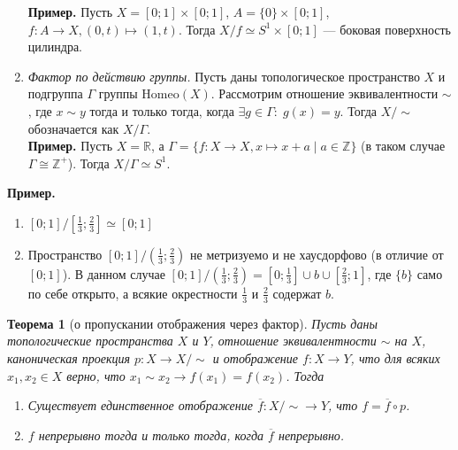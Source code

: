 \documentclass[a4paper,100pt]{article}
\theoremstyle{indented}
\newtheorem{theorem}{Теорема}
\begin{document}
\begin{enumerate}
        \textbf{Пример. }
            Пусть $X = [0; 1] \times [0; 1]$, $A = \{0\} \times [0; 1]$, $f: A \to X, (0, t) \mapsto (1, t)$. Тогда $X/f \simeq S^1 \times [0; 1]$ --- боковая поверхность цилиндра.
        

        \item \emph{Фактор по действию группы.} Пусть даны топологическое пространство $X$ и подгруппа $\Gamma$ группы $\text{Homeo}(X)$. Рассмотрим отношение эквивалентности $\sim$, где $x \sim y$ тогда и только тогда, когда $\exists g \in \Gamma:\; g(x) = y$. Тогда $X/{\sim}$ обозначается как $X/\Gamma$.\\
        
        \textbf{Пример. } 
            Пусть $X = \mathbb{R}$, а $\Gamma = \{f: X \to X, x \mapsto x + a \mid a \in \mathbb{Z}\}$ (в таком случае $\Gamma \cong \mathbb{Z}^+$). Тогда $X/\Gamma \simeq S^1$.
        
    \end{enumerate}

    \textbf{Пример. }
    \begin{enumerate}
        \item $[0; 1]/[\frac{1}{3}; \frac{2}{3}] \simeq [0; 1]$
        \item Пространство $[0; 1]/(\frac{1}{3}; \frac{2}{3})$ не метризуемо и не хаусдорфово (в отличие от $[0; 1]$). В данном случае $[0; 1]/(\frac{1}{3}; \frac{2}{3}) = [0; \frac{1}{3}] \cup {b} \cup [\frac{2}{3}; 1]$, где $\{b\}$ само по себе открыто, а всякие окрестности $\frac{1}{3}$ и $\frac{2}{3}$ содержат $b$.
    \end{enumerate}


\begin{theorem}[о пропускании отображения через фактор]
    Пусть даны топологические пространства $X$ и $Y$, отношение эквивалентности $\sim$ на $X$, каноническая проекция $p: X \to X/{\sim}$ и отображение $f: X \to Y$, что для всяких $x_1, x_2 \in X$ верно, что $x_1 \sim x_2 \rightarrow f(x_1) = f(x_2)$. Тогда
    \begin{enumerate}
        \item Существует единственное отображение $\overline{f}: X/{\sim} \to Y$, что $f = \overline{f} \circ p$.
        \item $f$ непрерывно тогда и только тогда, когда $\overline{f}$ непрерывно.
    \end{enumerate}
\end{theorem}
\end{document}
